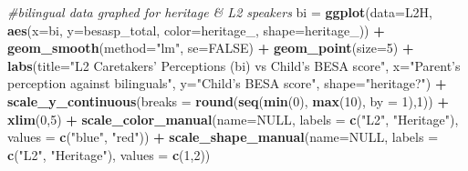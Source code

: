 \documentclass[
]{article}
\newenvironment{Shaded}{\begin{snugshade}}{\end{snugshade}}
\newcommand{\CommentTok}[1]{\textcolor[rgb]{0.56,0.35,0.01}{\textit{#1}}}
\newcommand{\DataTypeTok}[1]{\textcolor[rgb]{0.13,0.29,0.53}{#1}}
\newcommand{\DecValTok}[1]{\textcolor[rgb]{0.00,0.00,0.81}{#1}}
\newcommand{\KeywordTok}[1]{\textcolor[rgb]{0.13,0.29,0.53}{\textbf{#1}}}
\newcommand{\NormalTok}[1]{#1}
\newcommand{\OperatorTok}[1]{\textcolor[rgb]{0.81,0.36,0.00}{\textbf{#1}}}
\newcommand{\OtherTok}[1]{\textcolor[rgb]{0.56,0.35,0.01}{#1}}
\newcommand{\StringTok}[1]{\textcolor[rgb]{0.31,0.60,0.02}{#1}}
\begin{document}
\begin{Shaded}
\begin{Highlighting}[]
\CommentTok{#bilingual data graphed for heritage & L2 speakers}
\NormalTok{bi =}\StringTok{ }\KeywordTok{ggplot}\NormalTok{(}\DataTypeTok{data=}\NormalTok{L2H, }\KeywordTok{aes}\NormalTok{(}\DataTypeTok{x=}\NormalTok{bi, }\DataTypeTok{y=}\NormalTok{besasp_total, }\DataTypeTok{color=}\NormalTok{heritage_, }\DataTypeTok{shape=}\NormalTok{heritage_)) }\OperatorTok{+}
\StringTok{  }\KeywordTok{geom_smooth}\NormalTok{(}\DataTypeTok{method=}\StringTok{"lm"}\NormalTok{, }\DataTypeTok{se=}\OtherTok{FALSE}\NormalTok{) }\OperatorTok{+}
\StringTok{  }\KeywordTok{geom_point}\NormalTok{(}\DataTypeTok{size=}\DecValTok{5}\NormalTok{) }\OperatorTok{+}
\StringTok{  }\KeywordTok{labs}\NormalTok{(}\DataTypeTok{title=}\StringTok{"L2 Caretakers' Perceptions (bi) vs Child's BESA score"}\NormalTok{, }\DataTypeTok{x=}\StringTok{"Parent's perception against bilinguals"}\NormalTok{, }\DataTypeTok{y=}\StringTok{"Child's BESA score"}\NormalTok{, }\DataTypeTok{shape=}\StringTok{"heritage?"}\NormalTok{) }\OperatorTok{+}\StringTok{  }
\StringTok{  }\KeywordTok{scale_y_continuous}\NormalTok{(}\DataTypeTok{breaks =} \KeywordTok{round}\NormalTok{(}\KeywordTok{seq}\NormalTok{(}\KeywordTok{min}\NormalTok{(}\DecValTok{0}\NormalTok{), }\KeywordTok{max}\NormalTok{(}\DecValTok{10}\NormalTok{), }\DataTypeTok{by =} \DecValTok{1}\NormalTok{),}\DecValTok{1}\NormalTok{)) }\OperatorTok{+}
\StringTok{  }\KeywordTok{xlim}\NormalTok{(}\DecValTok{0}\NormalTok{,}\DecValTok{5}\NormalTok{) }\OperatorTok{+}
\StringTok{  }\KeywordTok{scale_color_manual}\NormalTok{(}\DataTypeTok{name=}\OtherTok{NULL}\NormalTok{,}
                     \DataTypeTok{labels =} \KeywordTok{c}\NormalTok{(}\StringTok{"L2"}\NormalTok{, }\StringTok{"Heritage"}\NormalTok{),}
                     \DataTypeTok{values =} \KeywordTok{c}\NormalTok{(}\StringTok{"blue"}\NormalTok{, }\StringTok{"red"}\NormalTok{)) }\OperatorTok{+}
\StringTok{  }\KeywordTok{scale_shape_manual}\NormalTok{(}\DataTypeTok{name=}\OtherTok{NULL}\NormalTok{,}
                     \DataTypeTok{labels =} \KeywordTok{c}\NormalTok{(}\StringTok{"L2"}\NormalTok{, }\StringTok{"Heritage"}\NormalTok{),}
                     \DataTypeTok{values =} \KeywordTok{c}\NormalTok{(}\DecValTok{1}\NormalTok{,}\DecValTok{2}\NormalTok{))}


\end{Highlighting}
\end{Shaded}
\end{document}
